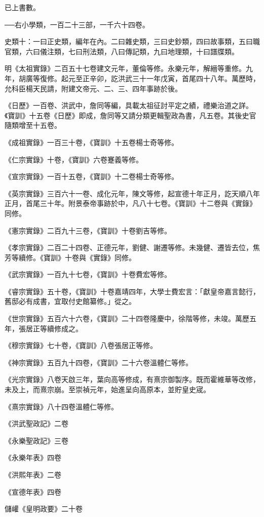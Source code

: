 已上書數。

──右小學類，一百二十三部，一千六十四卷。


史類十：一曰正史類，編年在內。二曰雜史類，三曰史鈔類，四曰故事類，五曰職官類，六曰儀注類，七曰刑法類，八曰傳記類，九曰地理類，十曰譜牒類。

明《太祖實錄》二百五十七卷建文元年，董倫等修。永樂元年，解縉等重修。九年，胡廣等復修。起元至正辛卯，訖洪武三十一年戊寅，首尾四十八年。萬歷時，允科臣楊天民請，附建文帝元、二、三、四年事跡於後。

《日歷》一百卷、洪武中，詹同等編，具載太祖征討平定之績，禮樂治道之詳。《寶訓》十五卷《日歷》即成，詹同等又請分類更輯聖政為書，凡五卷。其後史官隨類增至十五卷。

《成祖實錄》一百三十卷，《寶訓》十五卷楊士奇等修。

《仁宗實錄》十卷，《寶訓》六卷蹇義等修。

《宣宗實錄》一百十五卷，《寶訓》十二卷楊士奇等修。

《英宗實錄》三百六十一卷、成化元年，陳文等修，起宣德十年正月，訖天順八年正月，首尾三十年。附景泰帝事跡於中，凡八十七卷。《寶訓》十二卷與《實錄》同修。

《憲宗實錄》二百九十三卷，《寶訓》十卷劉吉等修。

《孝宗實錄》二百二十四卷、正德元年，劉健、謝遷等修。未幾健、遷皆去位，焦芳等續修。《寶訓》十卷與《實錄》同修。

《武宗實錄》一百九十七卷，《寶訓》十卷費宏等修。

《睿宗實錄》五十卷，《寶訓》十卷嘉靖四年，大學士費宏言：「獻皇帝嘉言懿行，舊邸必有成書，宜取付史館纂修。」從之。

《世宗實錄》五百六十六卷，《寶訓》二十四卷隆慶中，徐階等修，未竣。萬歷五年，張居正等續修成之。

《穆宗實錄》七十卷，《寶訓》八卷張居正等修。

《神宗實錄》五百九十四卷，《寶訓》二十六卷溫體仁等修。

《光宗實錄》八卷天啟三年，葉向高等修成，有熹宗御製序。既而霍維華等改修，未及上，而熹宗崩。至崇禎元年，始進呈向高原本，並貯皇史宬。

《熹宗實錄》八十四卷溫體仁等修。

《洪武聖政記》二卷

《永樂聖政記》三卷

《永樂年表》四卷

《洪熙年表》二卷

《宣德年表》四卷

儲巏《皇明政要》二十卷

